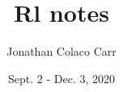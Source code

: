 \documentclass[10pt]{report}
\title{Rl notes}
\author{Jonathan Colaco Carr}
\begin{document}
\date{Sept. 2 - Dec. 3, 2020}
    


%
%
%



\end{document}
